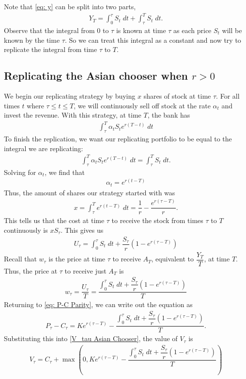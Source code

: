 \documentclass[reqno]{amsart}
\begin{document}
Note that \eqref{eq: y} can be split into
two parts, 
\begin{align}
     Y_T = \int_0^\tau S_t \; dt + \int_\tau^T S_t \; dt.
\end{align}
Observe that the integral from $0$ to $\tau$ is known at time $\tau$ as each price $S_t$ will be known by the time $\tau$. So we can treat this integral as a constant and now try to replicate the integral from time $\tau$ to $T$.

\subsection{Replicating the Asian chooser when $r > 0$}
We begin our replicating strategy by buying $x$ shares of stock at time $\tau$. For all times $t$ where $\tau \leq t \leq T$, we will continuously sell off stock at the rate $\alpha_t$ and invest the revenue.
With this strategy, at time $T$, the bank has 
\begin{align}
     \int_\tau^T \alpha_t S_t e^{r(T-t)} \; dt
\end{align}
To finish the replication, we want our replicating portfolio to be equal to the integral we are replicating:
\begin{align}
     \int_\tau^T \alpha_t S_t e^{r(T-t)} \; dt = \int_\tau^T S_t \; dt.
\end{align}
Solving for $\alpha_t$, we find that
\begin{align}
     \alpha_t = e^{r(t-T)}
\end{align}
Thus, the amount of shares our strategy started with was
\begin{align}
     x = \int_\tau^T e^{r(t-T)} \; dt = \dfrac{1}{r} - \dfrac{e^{r(\tau - T)}}{r}.
\end{align}
This tells us that the cost at time $\tau$ to receive the stock from times $\tau$ to $T$ continuously is $x S_\tau$. This gives us 
\begin{align}
     U_\tau = \int_0^\tau S_t \; dt + \dfrac{S_\tau}{r}\left( 1 - e^{r(\tau - T)} \right)
\end{align}
Recall that $w_\tau$ is the price at time $\tau$ to receive $A_T$, equivalent to $\dfrac{Y_T}{T}$, at time $T$.
Thus, the price at $\tau$ to receive just $A_T$ is 
\begin{align}
     w_\tau = \dfrac{U_\tau}{T} = \dfrac{\int_0^\tau S_t \; dt + \dfrac{S_\tau}{r}\left( 1 - e^{r(\tau - T)} \right)}{T}
\end{align}
Returning to \eqref{eq: P-C Parity}, we can write out the equation as
\begin{align}
     P_\tau - C_\tau = Ke^{r(\tau - T)} - \dfrac{\int_0^\tau S_t \; dt + \dfrac{S_\tau}{r}\left( 1 - e^{r(\tau - T)} \right)}{T}.
\end{align}
Substituting this into \eqref{V_tau Asian Chooser}, the value of $V_\tau$ is
\begin{align}
     V_\tau = C_\tau + \max(0, Ke^{r(\tau - T)} - \dfrac{\int_0^\tau S_t \; dt + \dfrac{S_\tau}{r}\left( 1 - e^{r(\tau - T)} \right)}{T})
\end{align}
\end{document}
